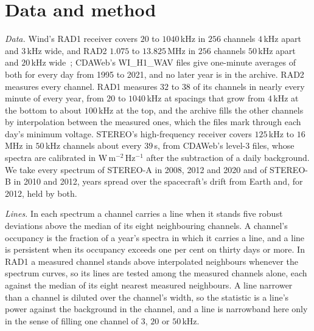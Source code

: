 \documentclass[3p,11pt]{elsarticle}
\begin{document}
\section{Data and method}\label{sec:method}

\emph{Data.} Wind's RAD1 receiver covers $20$ to $1040$\,kHz in $256$ channels $4$\,kHz
apart and $3$\,kHz wide, and RAD2 $1.075$ to $13.825$\,MHz in $256$ channels $50$\,kHz
apart and $20$\,kHz wide~\cite{Bougeret1995}; CDAWeb's WI\_H1\_WAV files give one-minute
averages of both for every day from 1995 to 2021, and no later year is in the archive.
RAD2 measures every channel. RAD1 measures $32$ to $38$ of its channels in nearly every
minute of every year, from $20$ to $1040$\,kHz at spacings that grow from $4$\,kHz at
the bottom to about $100$\,kHz at the top, and the archive fills the other channels by
interpolation between the measured ones, which the files mark through each day's minimum
voltage. STEREO's high-frequency receiver
covers $125$\,kHz to $16$\,MHz in $50$\,kHz channels about every $39$\,s, from CDAWeb's
level-3 files, whose spectra are calibrated in W\,m$^{-2}$\,Hz$^{-1}$ after the
subtraction of a daily background. We take every spectrum of STEREO-A in 2008, 2012 and
2020 and of STEREO-B in 2010 and 2012, years spread over the spacecraft's drift from
Earth and, for 2012, held by both.

\emph{Lines.} In each spectrum a channel carries a line when it stands five robust
deviations above the median of its eight neighbouring channels. A channel's occupancy is
the fraction of a year's spectra in which it carries a line, and a line is persistent
when its occupancy exceeds one per cent on thirty days or more. In RAD1 a measured
channel stands above interpolated neighbours whenever the spectrum curves, so its lines
are tested among the measured channels alone, each against the median of its eight
nearest measured neighbours. A line narrower than a channel is diluted over the channel's
width, so the statistic is a line's power against the background in the channel, and a
line is narrowband here only in the sense of filling one channel of $3$, $20$ or
$50$\,kHz.
\end{document}
